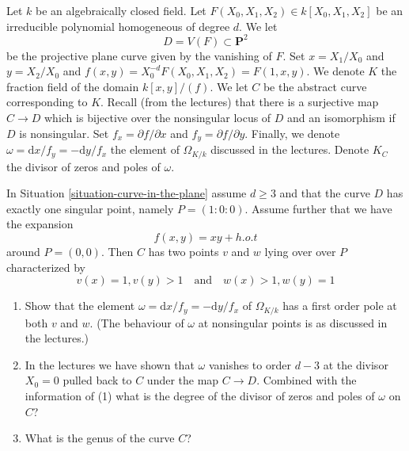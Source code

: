 \begin{situation}
\label{situation-curve-in-the-plane}
Let $k$ be an algebraically closed field. Let
$F(X_0, X_1, X_2) \in k[X_0, X_1, X_2]$ be an irreducible polynomial
homogeneous of degree $d$. We let
$$
D = V(F) \subset \mathbf{P}^2
$$
be the projective plane curve given by the vanishing of $F$.
Set $x = X_1/X_0$ and $y = X_2/X_0$ and
$f(x, y) = X_0^{-d}F(X_0, X_1, X_2) = F(1, x, y)$.
We denote $K$ the fraction field of the domain $k[x, y]/(f)$.
We let $C$ be the abstract curve corresponding to $K$.
Recall (from the lectures) that there is a surjective map $C \to D$
which is bijective over the nonsingular locus of $D$ and an
isomorphism if $D$ is nonsingular.
Set $f_x = \partial f/\partial x$ and $f_y = \partial f/\partial y$.
Finally, we denote $\omega = \text{d}x/f_y = - \text{d}y/f_x$ the
element of $\Omega_{K/k}$ discussed in the lectures.
Denote $K_C$ the divisor of zeros and poles of $\omega$.
\end{situation}

\begin{exercise}
\label{exercise-node-in-the-plane}
In Situation \ref{situation-curve-in-the-plane} assume
$d \geq 3$ and that the curve $D$ has exactly one singular point,
namely $P = (1 : 0 : 0)$. Assume further that we have the expansion
$$
f(x, y) = xy + h.o.t
$$
around $P = (0, 0)$. Then $C$ has two points $v$ and $w$ lying over
over $P$ characterized by
$$
v(x) = 1, v(y) > 1
\quad\text{and}\quad
w(x) > 1, w(y) = 1
$$
\begin{enumerate}
\item Show that the element
$\omega = \text{d}x/f_y = - \text{d}y/f_x$ of $\Omega_{K/k}$
has a first order pole at both $v$ and $w$. (The behaviour of
$\omega$ at nonsingular points is as discussed in the lectures.)
\item In the lectures we have shown that $\omega$ vanishes to order
$d - 3$ at the divisor $X_0 = 0$ pulled back to $C$ under the map
$C \to D$. Combined with the information of (1) what is the degree
of the divisor of zeros and poles of $\omega$ on $C$?
\item What is the genus of the curve $C$?
\end{enumerate}
\end{exercise}

